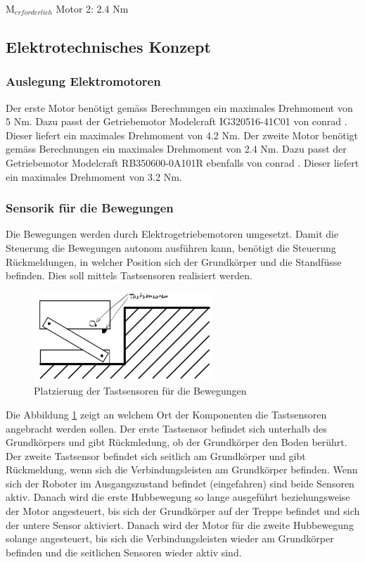 M$_{erforderlich}$ Motor 2: 2.4 Nm

\newpage
\subsection{Elektrotechnisches Konzept}
\subsubsection{Auslegung Elektromotoren}
Der erste Motor benötigt gemäss Berechnungen ein maximales Drehmoment von 5 Nm. Dazu passt der Getriebemotor Modelcraft IG320516-41C01 von conrad \cite{Getriebemotor1}. Dieser liefert ein maximales Drehmoment von 4.2 Nm. 
Der zweite Motor benötigt gemäss Berechnungen ein maximales Drehmoment von 2.4 Nm. Dazu passt der Getriebemotor Modelcraft RB350600-0A101R ebenfalls von conrad \cite{Getriebemotor2}. Dieser liefert ein maximales Drehmoment von 3.2 Nm.

\subsubsection{Sensorik für die Bewegungen}
Die Bewegungen werden durch Elektrogetriebemotoren umgesetzt. Damit die Steuerung die Bewegungen autonom ausführen kann, benötigt die Steuerung Rückmeldungen, in welcher Position sich der Grundkörper und die Standfüsse befinden. Dies soll mittels Tastsensoren realisiert werden.

\begin{figure}[h]
  \includegraphics[width=0.6\textwidth]{img/Treppensteigen/Sensoren_Treppensteigen2.png}
  \centering
  \caption{Platzierung der Tastsensoren für die Bewegungen}
  \label{fig2}
\end{figure}

Die Abbildung \ref{fig2} zeigt an welchem Ort der Komponenten die Tastsensoren angebracht werden sollen. Der erste Tastsensor befindet sich unterhalb des Grundkörpers und gibt Rückmledung, ob der Grundkörper den Boden berührt. Der zweite Tastsensor befindet sich seitlich am Grundkörper und gibt Rückmeldung, wenn sich die Verbindungsleisten am Grundkörper befinden. Wenn sich der Roboter im Ausgangszustand befindet (eingefahren) sind beide Sensoren aktiv. Danach wird die erste Hubbewegung so lange ausgeführt beziehungsweise der Motor angesteuert, bis sich der Grundkörper auf der Treppe befindet und sich der untere Sensor aktiviert. Danach wird der Motor für die zweite  Hubbewegung solange angesteuert, bis sich die Verbindungsleisten wieder am Grundkörper befinden und die seitlichen Sensoren wieder aktiv sind.


